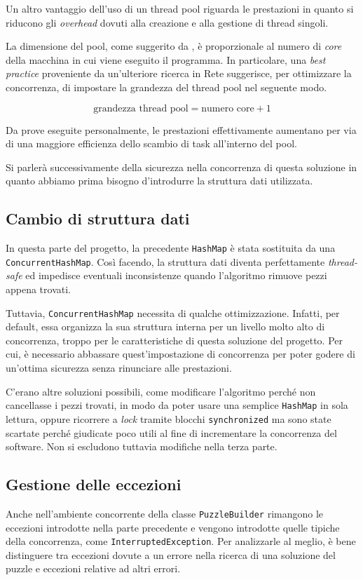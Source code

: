 \documentclass[a4paper, 12pt]{article}
\begin{document}
Un altro vantaggio dell'uso di un thread pool riguarda le prestazioni in quanto
si riducono gli \emph{overhead} dovuti alla creazione e alla gestione di thread
singoli.

La dimensione del pool, come suggerito da \cite{goetz2006java}, è proporzionale
al numero di \emph{core} della macchina in cui viene eseguito il programma. In
particolare, una \emph{best practice} proveniente da un'ulteriore ricerca in
Rete suggerisce, per ottimizzare la concorrenza, di impostare la grandezza del
thread pool nel seguente modo.

\[ \text{grandezza thread pool} = \text{numero core} + 1 \]

Da prove eseguite personalmente, le prestazioni effettivamente aumentano per via
di una maggiore efficienza dello scambio di task all'interno del pool.

Si parlerà successivamente della sicurezza nella concorrenza di questa soluzione
in quanto abbiamo prima bisogno d'introdurre la struttura dati utilizzata.

\subsection{Cambio di struttura dati}
\label{struttura-dati}

In questa parte del progetto, la precedente \verb|HashMap| è stata sostituita da
una \verb|ConcurrentHashMap|. Così facendo, la struttura dati diventa
perfettamente \emph{thread-safe} ed impedisce eventuali inconsistenze quando
l'algoritmo rimuove pezzi appena trovati.

Tuttavia, \verb|ConcurrentHashMap| necessita di qualche ottimizzazione.
Infatti, per default, essa organizza la sua struttura interna per un livello
molto alto di concorrenza, troppo per le caratteristiche di questa soluzione del
progetto. Per cui, è necessario abbassare quest'impostazione di concorrenza per
poter godere di un'ottima sicurezza senza rinunciare alle prestazioni.

C'erano altre soluzioni possibili, come modificare l'algoritmo perché non
cancellasse i pezzi trovati, in modo da poter usare una semplice \verb|HashMap|
in sola lettura, oppure ricorrere a \emph{lock} tramite blocchi
\verb|synchronized| ma sono state scartate perché giudicate poco utili al fine
di incrementare la concorrenza del software. Non si escludono tuttavia modifiche
nella terza parte.

\subsection{Gestione delle eccezioni}
Anche nell'ambiente concorrente della classe \verb|PuzzleBuilder| rimangono le
eccezioni introdotte nella parte precedente e vengono introdotte quelle tipiche
della concorrenza, come \verb|InterruptedException|. Per analizzarle al meglio,
è bene distinguere tra eccezioni dovute a un errore nella ricerca di una
soluzione del puzzle e eccezioni relative ad altri errori.
\end{document}
